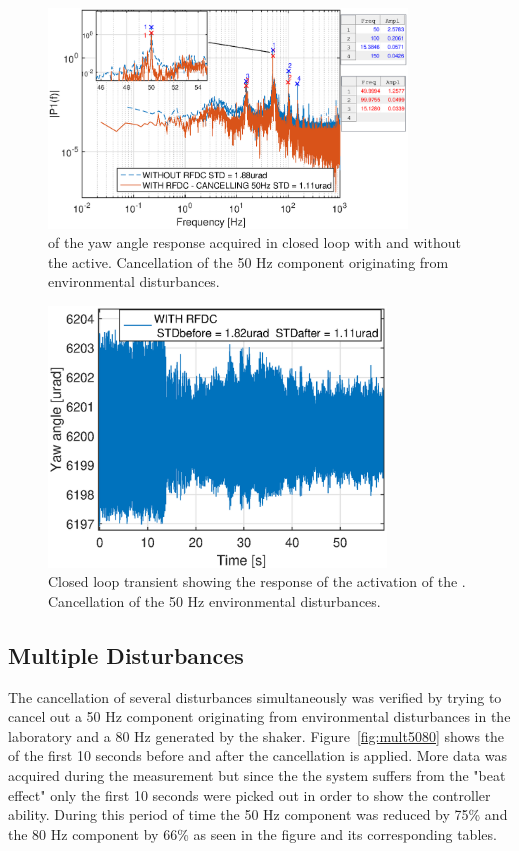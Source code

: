 \begin{figure}[h]
  \centering %
  \includegraphics[width=0.85\textwidth]{fig/matlab/fft_closedloop_50Hz}
  \caption{\label{fig:fft_closedloop_50}\abbrFFT of the yaw angle response acquired in closed loop with and without the \abbrRFDC active. Cancellation of the 50 Hz component originating from environmental disturbances.}
\end{figure}

\begin{figure}[h]
  \centering %
  \includegraphics[width=0.8\textwidth]{fig/matlab/transient_closedloop_50Hz}
  \caption{\label{fig:transient_closedloop_50}Closed loop transient showing the response of the activation of the \abbrRFDC. Cancellation of the 50 Hz environmental disturbances.}
\end{figure}

\FloatBarrier
\subsection{Multiple Disturbances}
The cancellation of several disturbances simultaneously was verified by trying to cancel out a 50 Hz component originating from environmental disturbances in the laboratory and a 80 Hz generated by the shaker. Figure~\ref{fig:mult5080} shows the \abbrFFT of the first 10 seconds before and after the cancellation is applied. More data was acquired during the measurement but since the the system suffers from the "beat effect" only the first 10 seconds were picked out in order to show the controller ability. During this period of time the 50 Hz component was reduced by 75\% and the 80 Hz component by 66\% as seen in the figure and its corresponding tables.


